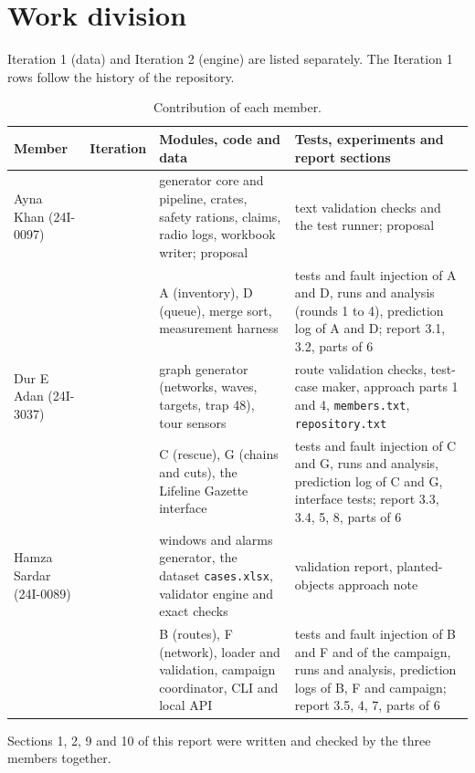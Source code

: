 \documentclass[11pt,a4paper]{article}
\newcommand{\cs}[1]{\texttt{#1}}
\begin{document}
\section{Work division}\label{sec:work}
Iteration 1 (data) and Iteration 2 (engine) are listed separately. The Iteration 1 rows follow the history of the repository.
\begin{table}[!ht]
\centering\small
\caption{Contribution of each member.}\label{tab:work}
\begin{tabularx}{\textwidth}{@{}>{\raggedright\arraybackslash}p{2.3cm}>{\raggedright\arraybackslash}p{1.5cm}XX@{}}
\toprule
Member & Iteration & Modules, code and data & Tests, experiments and report sections\\
\midrule
Ayna Khan (24I-0097) & 1 & generator core and pipeline, crates, safety rations, claims, radio logs, workbook writer; proposal & text validation checks and the test runner; proposal\\
 & 2 & A (inventory), D (queue), merge sort, measurement harness & tests and fault injection of A and D, runs and analysis (rounds 1 to 4), prediction log of A and D; report 3.1, 3.2, parts of 6\\
\addlinespace
Dur E Adan (24I-3037) & 1 & graph generator (networks, waves, targets, trap 48), tour sensors & route validation checks, test-case maker, approach parts 1 and 4, \cs{members.txt}, \cs{repository.txt}\\
 & 2 & C (rescue), G (chains and cuts), the Lifeline Gazette interface & tests and fault injection of C and G, runs and analysis, prediction log of C and G, interface tests; report 3.3, 3.4, 5, 8, parts of 6\\
\addlinespace
Hamza Sardar (24I-0089) & 1 & windows and alarms generator, the dataset \cs{cases.xlsx}, validator engine and exact checks & validation report, planted-objects approach note\\
 & 2 & B (routes), F (network), loader and validation, campaign coordinator, CLI and local API & tests and fault injection of B and F and of the campaign, runs and analysis, prediction logs of B, F and campaign; report 3.5, 4, 7, parts of 6\\
\bottomrule
\end{tabularx}
\end{table}
Sections 1, 2, 9 and 10 of this report were written and checked by the three members together.
\end{document}
